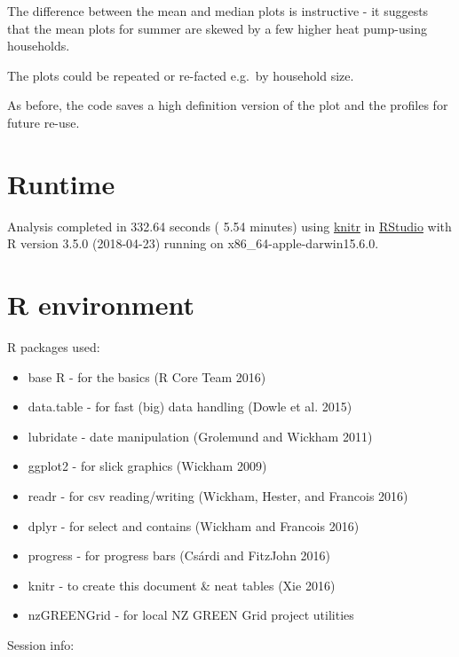 \documentclass[]{article}
\providecommand{\tightlist}{%
  \setlength{\itemsep}{0pt}\setlength{\parskip}{0pt}}
\begin{document}
The difference between the mean and median plots is instructive - it
suggests that the mean plots for summer are skewed by a few higher heat
pump-using households.

The plots could be repeated or re-facted e.g.~by household size.

As before, the code saves a high definition version of the plot and the
profiles for future re-use.

\section{Runtime}\label{runtime}

Analysis completed in 332.64 seconds ( 5.54 minutes) using
\href{https://cran.r-project.org/package=knitr}{knitr} in
\href{http://www.rstudio.com}{RStudio} with R version 3.5.0 (2018-04-23)
running on x86\_64-apple-darwin15.6.0.

\section{R environment}\label{r-environment}

R packages used:

\begin{itemize}
\tightlist
\item
  base R - for the basics (R Core Team 2016)
\item
  data.table - for fast (big) data handling (Dowle et al. 2015)
\item
  lubridate - date manipulation (Grolemund and Wickham 2011)
\item
  ggplot2 - for slick graphics (Wickham 2009)
\item
  readr - for csv reading/writing (Wickham, Hester, and Francois 2016)
\item
  dplyr - for select and contains (Wickham and Francois 2016)
\item
  progress - for progress bars (Csárdi and FitzJohn 2016)
\item
  knitr - to create this document \& neat tables (Xie 2016)
\item
  nzGREENGrid - for local NZ GREEN Grid project utilities
\end{itemize}

Session info:
\end{document}
